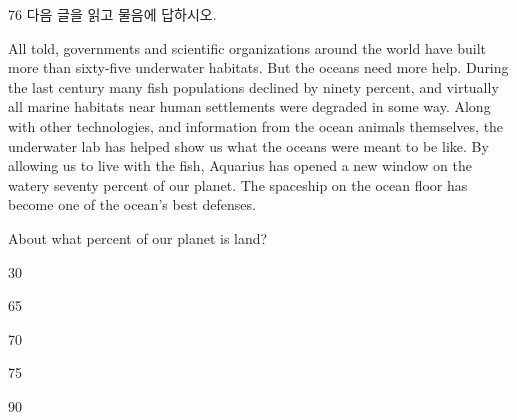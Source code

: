 \begin{question}{76}
다음 글을 읽고 물음에 답하시오.
\begin{framedtext}
All told, governments and scientific organizations around the world have built more than sixty-five underwater habitats. But the oceans need more help. During the last century many fish populations declined by ninety percent, and virtually all marine habitats near human settlements were degraded in some way. Along with other technologies, and information from the ocean animals themselves, the underwater lab has helped show us what the oceans were meant to be like. By allowing us to live with the fish, Aquarius has opened a new window on the watery seventy percent of our planet. The spaceship on the ocean floor has become one of the ocean's best defenses.
\end{framedtext}
About what percent of our planet is land? \par
\begin{choices}
  \item 30
  \item 65
  \item 70
  \item 75
  \item 90
\end{choices}
\end{question}
